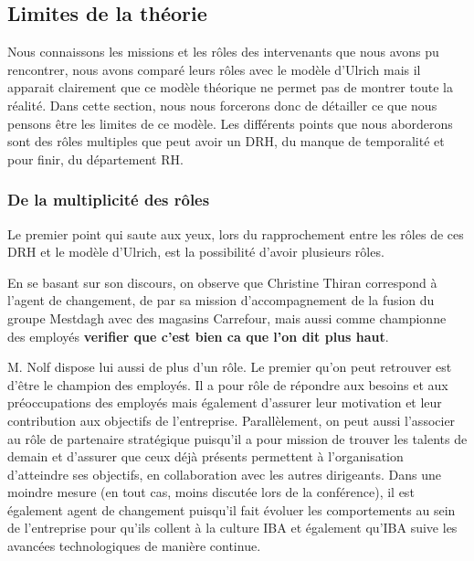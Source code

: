 \subsection{Limites de la théorie}

Nous connaissons les missions et les rôles des intervenants que nous avons pu rencontrer, nous avons comparé leurs rôles avec le modèle d'Ulrich mais il apparait clairement que ce modèle théorique ne permet pas de montrer toute la réalité. Dans cette section, nous nous forcerons donc de détailler ce que nous pensons être les limites de ce modèle. Les différents points que nous aborderons sont des rôles multiples que peut avoir un DRH, du manque de temporalité et pour finir, du département RH. \\


\subsubsection{De la multiplicité des rôles} 

Le premier point qui saute aux yeux, lors du rapprochement entre les rôles de ces DRH et le modèle d'Ulrich, est la possibilité d'avoir plusieurs rôles. \newline

En se basant sur son discours, on observe que Christine Thiran correspond à l'\og{}agent de changement\fg{}, de par sa mission d'accompagnement de la fusion du groupe Mestdagh avec des magasins Carrefour, mais aussi comme \og{}championne des employés\fg{} \textbf{verifier que c'est bien ca que l'on dit plus haut}. \newline

M. Nolf dispose lui aussi de plus d'un rôle. Le premier qu'on peut retrouver est d'être le \og{}champion des employés\fg{}. Il a pour rôle de répondre aux besoins et aux préoccupations des employés mais également d'assurer leur motivation et leur contribution aux objectifs de l'entreprise. Parallèlement, on peut aussi l'associer au rôle de \og{}partenaire stratégique \fg{} puisqu'il a pour mission de trouver les talents de demain et d'assurer que ceux déjà présents permettent à l'organisation d'atteindre ses objectifs, en collaboration avec les autres dirigeants. Dans une moindre mesure (en tout cas, moins discutée lors de la conférence), il est également \og{}agent de changement\fg{} puisqu'il fait évoluer les comportements au sein de l'entreprise pour qu'ils collent à la culture IBA et également qu'IBA suive les avancées technologiques de manière continue. 


